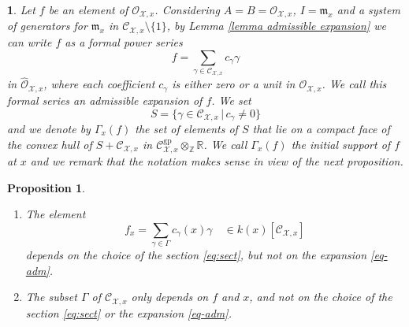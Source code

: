 \documentclass{amsart}%
\numberwithin{equation}{subsection}
\theoremstyle{plain2}
\newtheorem{prop}[equation]{Proposition}
\theoremstyle{definition2}
\theoremstyle{stepstyle}
\theoremstyle{point}
\theoremstyle{subpoint}
\newtheorem{subpoint}[equation]{}%
\newcommand{\spa}[1]{\begin{subpoint}#1\end{subpoint}}           %
\newcommand{\Z}{\ensuremath{\mathbb{Z}}}
\newcommand{\R}{\ensuremath{\mathbb{R}}}
\newcommand{\cX}{\ensuremath{\mathscr{X}}}
\newcommand{\caC}{\ensuremath{\mathcal{C}}}
\newcommand{\caO}{\ensuremath{\mathcal{O}}}
\renewcommand{\R}{\ensuremath{\mathbb{R}}}
\newcommand{\gp}{\mathrm{gp}}
\begin{document}
\spa{ \label{paragr admissible expansion}Let $f$ be an element of $\mathcal{O}_{\cX,x}$. Considering $A=B=\caO_{\cX,x}$, $I=\mathfrak{m}_x$ and a system of generators for $\mathfrak{m}_x$ in $\caC_{\cX,x} \setminus \{1\}$, by Lemma \ref{lemma admissible expansion} we can write $f$ as a formal power series
\begin{equation}\label{eq-adm}
f=\sum_{\gamma \in \mathcal{C}_{\cX,x}}c_{\gamma}\gamma
\end{equation}
 in
$\widehat{\mathcal{O}}_{\cX,x}$, where each coefficient $c_\gamma$
 is either zero or a unit in $\mathcal{O}_{\cX,x}$. We call this formal series an \textit{admissible expansion} of $f$. We set
 \begin{equation}\label{equ def S}
S=\{\gamma\in\mathcal{C}_{\cX,x}\,|\,c_\gamma\neq 0\}
 \end{equation} and we denote by $\Gamma_x(f)$ the set of elements of $S$ that lie on a compact face of the convex hull of $S+ \mathcal{C}_{\cX,x}$ in $\mathcal{C}^{\gp}_{\cX,x}\otimes_{\Z}\R$. We call $\Gamma_x(f)$ the {\em initial support} of $f$ at $x$ and we remark that the notation  makes sense in view of the next proposition.}
\begin{prop}\label{prop-init}\item
\begin{enumerate}
\item \label{it:indep1} The element
$$f_x=\sum_{\gamma\in \Gamma}c_\gamma(x) \gamma\quad \in k(x)[\mathcal{C}_{\cX,x}]$$ depends on the choice of the section \eqref{eq:sect}, but not on the expansion \eqref{eq-adm}. \item \label{it:indep2} The subset $\Gamma$ of $\mathcal{C}_{\cX,x}$ only depends on $f$ and $x$, and not on the choice of the section \eqref{eq:sect} or the expansion \eqref{eq-adm}.
\end{enumerate}
\end{prop}
\end{document}

